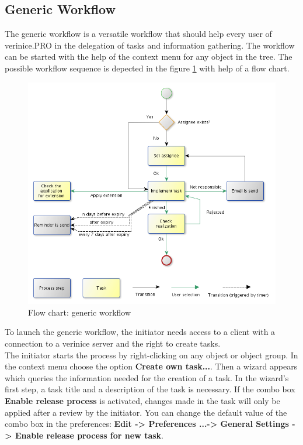 \documentclass[a4paper,10pt]{book}
\begin{document}
\subsection{Generic Workflow}
The generic workflow is a versatile workflow that should help every user of verinice.\textsc{PRO} in the delegation of tasks and information gathering.
The workflow can be started with the help of the context menu for any object in the tree.
The possible workflow sequence is depected in the figure \ref{Flow chart: generic workflow} with help of a flow chart.
\begin{figure}[htb!]
  \centering
  \includegraphics[scale=.50]{Screenshot/Generic-workflow-en.png}
  \caption{\label{Flow chart: generic workflow} Flow chart: generic workflow}
\end{figure}
To launch the generic workflow, the initiator needs access to a client with a connection to a verinice server and the right to create tasks.
\newline\\
The initiator starts the process by right-clicking on any object or object group.
In the context menu choose the option \textbf{Create own task...}. Then a wizard appears which queries the information needed for the creation of a task. In the wizard's first step, a task title and a description of the task is necessary. If the combo box \textbf{Enable release process} is activated, changes made in the task will only be applied after a review by the initiator. You can change the default value of the combo box in the preferences: \textbf{Edit -> Preferences ...-> General Settings -> Enable release process for new task}.
\end{document}
